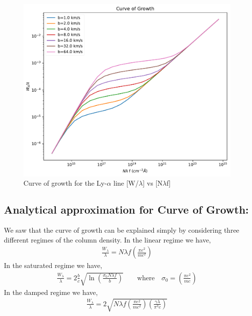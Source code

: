 \documentclass[12pt]{article}
\begin{document}
\begin{figure}[H]
\centering
\includegraphics[width=1 \linewidth]{../CoG_Ly-alpha_gen}
\caption{Curve of growth for the Ly-$\alpha$ line [W/$\lambda$] vs [N$\lambda$f]}
\label{fig:cog-ly-alpha_gen}
\end{figure}




\subsection{Analytical approximation for Curve of Growth:}
\label{sec:approx}
We saw that the curve of growth can be explained simply by considering three different regimes of the column density.
In the linear regime we have,
\begin{align}
\frac{W_{\lambda}}{\lambda} = N \lambda f \left( \frac{\pi e^2}{mc^2} \right) 
\end{align}
In the saturated regime we have,
\begin{align}
\frac{W_{\lambda}}{\lambda} = 2 \frac{b}{c} \sqrt{\ln \left( \frac{\sigma_{0} N \lambda f}{b}\right) } \qquad \text{where} \quad \sigma_{0} = \left( \frac{\pi e^2}{mc} \right) 
\end{align}
In the damped regime we have,
\begin{align}
\frac{W_{\lambda}}{\lambda} = 2 \sqrt{ N \lambda f \left( \frac{\pi e^2}{mc^2} \right) \left( \frac{\gamma \lambda}{\pi^3c} \right)  }
\end{align}
\end{document}
